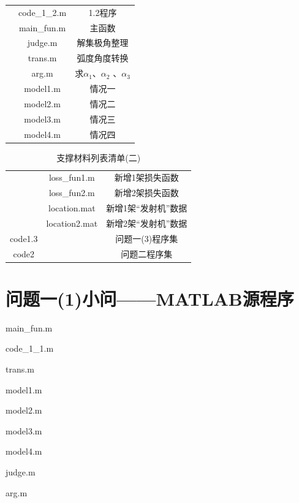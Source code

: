 \documentclass[withoutpreface,bwprint]{cumcmthesis}
\begin{document}
\begin{appendices}
\begin{table}[htbp]
\begin{tabular}{ccc}
				&code\_1\_2.m  & 1.2程序 \\
				
				&main\_fun.m  & 主函数\\
				
				&judge.m  & 解集极角整理\\
				
				&trans.m  & 弧度角度转换 \\
				&arg.m & 求$\alpha_{1}$、$\alpha_{2}$ 、$\alpha_{3}$  \\
				&model1.m  & 情况一 \\
				&model2.m  & 情况二 \\
				&model3.m  & 情况三 \\
				&model4.m  & 情况四 \\
				
				\bottomrule
			\end{tabular}%
			\label{tab:addlabel}%
		\end{table}%
		\begin{table}[htbp]
			\renewcommand\arraystretch{0.1}
			\tabcolsep=0.2cm
			\centering
			\caption{支撑材料列表清单(二)}
			\begin{tabular}{ccc}
				\toprule[1.5pt]
				\makebox[0.27\textwidth][c]{文件夹名}	& \makebox[0.3\textwidth][c]{文件夹内容}	& \makebox[0.4\textwidth][c]{文件描述} \\ 
				\midrule
				&loss\_fun1.m  & 新增1架损失函数\\
				&loss\_fun2.m  & 新增2架损失函数\\
				&location.mat  & 新增1架“发射机”数据 \\
				&location2.mat  & 新增2架“发射机”数据 \\
				code1.3	& & 问题一(3)程序集 \\
				code2	& & 问题二程序集 \\
				\bottomrule
			\end{tabular}%
			\label{tab:addlabel}%
		\end{table}%
		
		
		\section{问题一(1)小问——MATLAB源程序}
		main\_fun.m
		
		code\_1\_1.m
			
		trans.m
		
		model1.m
		
		model2.m
		
		model3.m
		
		model4.m
		
		judge.m
		
		arg.m
		

\end{appendices}
\end{document}
